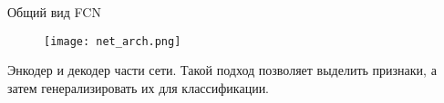 
\begin{frame}{Общий вид FCN}
\begin{figure}
\centering
\texttt{[image: net\_arch.png]}
\end{figure}
    Энкодер и декодер части сети.
    Такой подход позволяет выделить признаки, а затем генерализировать их для классификации.
\end{frame}
